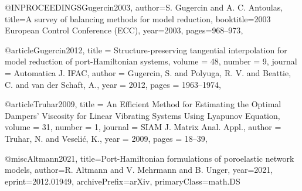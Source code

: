 @INPROCEEDINGS{Gugercin2003,
  author={S. {Gugercin} and A. C. {Antoulas}},
  title={A survey of balancing methods for model reduction}, 
  booktitle={2003 European Control Conference (ECC)}, 
  year={2003},
  pages={968--973},
}

@article{Gugercin2012,
	title = {Structure-preserving tangential interpolation for model reduction of port-{Hamiltonian} systems},
	volume = {48},
	number = {9},
	journal = {Automatica J. IFAC},
	author = {Gugercin, S. and Polyuga, R. V. and Beattie, C. and van der Schaft, A.},
	year = {2012},
	pages = {1963--1974},
}

@article{Truhar2009,
	title = {An Efficient Method for Estimating the Optimal Dampers' Viscosity for Linear Vibrating Systems Using {L}yapunov Equation},
	volume = {31},
	number = {1},
	journal = {SIAM J. Matrix Anal. Appl.},
	author = {Truhar, N. and Veseli\'c, K.},
	year = {2009},
	pages = {18--39},
}

@misc{Altmann2021,
      title={Port-Hamiltonian formulations of poroelastic network models}, 
      author={R. Altmann and V. Mehrmann and B. Unger},
      year={2021},
      eprint={2012.01949},
      archivePrefix={arXiv},
      primaryClass={math.DS}
}

